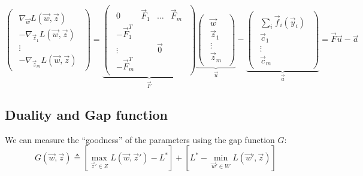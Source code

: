 \begin{equation}
  \begin{pmatrix}
    \begin{array}{c} \nabla_{\vec w} {L}(\vec w,\vec z)\\
      -\nabla_{\vec z_1} {L}(\vec w,\vec z)\\
      \vdots\\
      -\nabla_{\vec z_m} {L}(\vec w,\vec z)
    \end{array}
  \end{pmatrix} =
  \underbrace{
    \begin{pmatrix}
      \begin{array}{cccc}
        0 & \vec F_1 & \dots & \vec F_m\\
        -\vec F_1^T & & &\\
        \vdots & & \vec 0 &\\
        -\vec F_m^T & & &
      \end{array}
    \end{pmatrix}}_{\vec F}
  \underbrace{
    \begin{pmatrix}
      \begin{array}{c}
        \vec w\\
        \vec z_1\\
        \vdots\\
        \vec z_m
      \end{array}
    \end{pmatrix}}_{\vec u}-
  \underbrace{
    \begin{pmatrix}
      \begin{array}{c}
        \sum_i \vec f_i(\vec y_i)\\
        \vec c_1\\
        \vdots\\
        \vec c_m
      \end{array}
    \end{pmatrix}}_{\vec a} = \vec F \vec u - \vec a
\end{equation}

\clearpage
\subsection{Duality and Gap function}
We can measure the ``goodness'' of the parameters using the gap function
${G}$:
\begin{equation}
  {G}(\vec w, \vec z) \triangleq \left[ \max_{\vec z' \in {Z}}
{L}(\vec w,\vec z') - {L}^* \right] + \left[ {L}^* -
\min_{\vec w' \in {W}} {L}(\vec w', \vec z) \right]
\end{equation}

